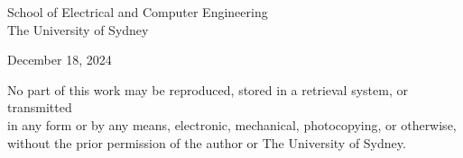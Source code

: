 \begin{titlepage}
\begin{flushleft}
\begin{center}
        \vspace{0.8cm}

        School of Electrical and Computer Engineering\\
        The University of Sydney

        \vspace{0.8cm}
        
        December 18, 2024
        
        \vspace{2cm}
        
        \end{center}
        
    \end{flushleft}
    

\end{titlepage}

\newpage
\thispagestyle{empty}
\begin{center}
    \vspace*{\fill}
    
    
    No part of this work may be reproduced, stored in a retrieval system, or transmitted \\
    in any form or by any means, electronic, mechanical, photocopying, or otherwise, \\
    without the prior permission of the author or The University of Sydney.
\end{center}
